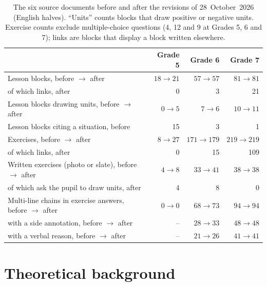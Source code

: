 \documentclass[11pt,a4paper]{article}
\theoremstyle{definition}
\begin{document}
\begin{table}[htbp]
\centering\small
\caption{The six source documents before and after the revisions of 28~October~2026 (English halves). ``Units'' counts blocks that draw positive or negative units. Exercise counts exclude multiple-choice questions (4, 12 and 9 at Grades 5, 6 and 7); links are blocks that display a block written elsewhere.}
\label{tab:corpus}
\begin{tabular}{lrrr}
\toprule
 & Grade 5 & Grade 6 & Grade 7 \\
\midrule
Lesson blocks, before $\to$ after & $18\to21$ & $57\to57$ & $81\to81$ \\
\quad of which links, after & 0 & 3 & 21 \\
Lesson blocks drawing units, before $\to$ after & $0\to5$ & $7\to6$ & $10\to11$ \\
Lesson blocks citing a situation, before & 15 & 3 & 1 \\
Exercises, before $\to$ after & $8\to27$ & $171\to179$ & $219\to219$ \\
\quad of which links, after & 0 & 15 & 109 \\
Written exercises (photo or slate), before $\to$ after & $4\to8$ & $33\to41$ & $38\to38$ \\
\quad of which ask the pupil to draw units, after & 4 & 8 & 0 \\
Multi-line chains in exercise answers, before $\to$ after & $0\to0$ & $68\to73$ & $94\to94$ \\
\quad with a side annotation, before $\to$ after & -- & $28\to33$ & $48\to48$ \\
\quad with a verbal reason, before $\to$ after & -- & $21\to26$ & $41\to41$ \\
\bottomrule
\end{tabular}
\end{table}

\section{Theoretical background}\label{sec:background}
\end{document}
